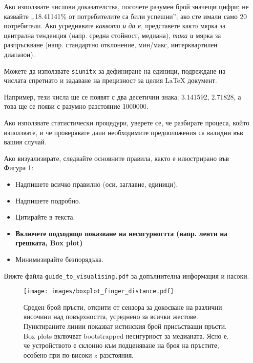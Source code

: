 Ако използвате числови доказателства, посочете разумен брой значещи цифри; не казвайте ,,18.41141\% от потребителите са били успешни'', ако сте имали само 20 потребители. Ако усреднявате \textit{каквото и да е}, представете както мярка за централна тенденция (напр. средна стойност, медиана), \textit{така и} мярка за разпръскване (напр. стандартно отклонение, мин/макс, интерквартилен диапазон).

Можете да използвате \texttt{siunitx} за дефиниране на единици, подреждане на числата спретнато и задаване на прецизност за целия LaTeX документ. 


Например, тези числа ще се появят с два десетични знака: \num{3.141592}, \num{2.71828}, а това ще се появи с разумно разстояние \num{1000000}.

Ако използвате статистически процедури, уверете се, че разбирате процеса, който използвате,
и че проверявате дали необходимите предположения са валидни във вашия случай. 

Ако визуализирате, следвайте основните правила, както е илюстрирано във Фигура \cref{fig:boxplot}:
\begin{itemize}
\item Надпишете всичко правилно (оси, заглавие, единици).
\item Надпишете подробно.
\item Цитирайте в текста.
\item \textbf{Включете подходящо показване на несигурността (напр. ленти на грешката, Box plot)}
\item Минимизирайте безпорядъка.
\end{itemize}

Вижте файла \texttt{guide\_to\_visualising.pdf} за допълнителна информация и насоки.

\begin{figure}[htb]
    \centering
    \texttt{[image: images/boxplot\_finger\_distance.pdf]}    

    \caption{Среден брой пръсти, открити от сензора за докосване на различни височини над повърхността, усреднено за всички жестове. Пунктираните линии показват
    истинския брой присъстващи пръсти. Box plots включват bootstrapped несигурност за медианата. Ясно е, че устройството е склонно към
    подценяване на броя на пръстите, особено при по-високи $z$ разстояния.
    }

    \label{fig:boxplot} 
\end{figure}

